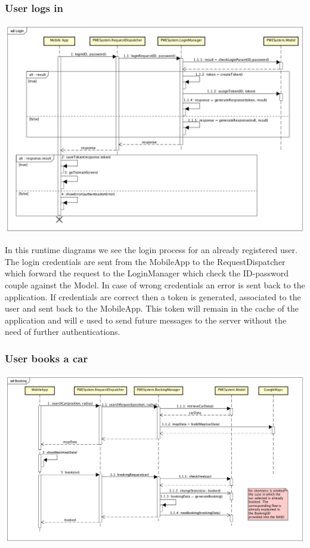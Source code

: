 \documentclass[]{article}
\begin{document}
\subsubsection{User logs in}\label{user-logs-in}

\centerline{\includegraphics{./runtime_diagrams/login_runtime.png}}

In this runtime diagrams we see the login process for an already
registered user. The login credentials are sent from the MobileApp to
the RequestDispatcher which forward the request to the LoginManager
which check the ID-password couple against the Model. In case of wrong
credentials an error is sent back to the application. If credentials are
correct then a token is generated, associated to the user and sent back
to the MobileApp. This token will remain in the cache of the application
and will e used to send future messages to the server without the need
of further authentications.

\subsubsection{User books a car}\label{user-books-a-car}

\centerline{\includegraphics{./runtime_diagrams/booking_runtime.png}}
\end{document}
